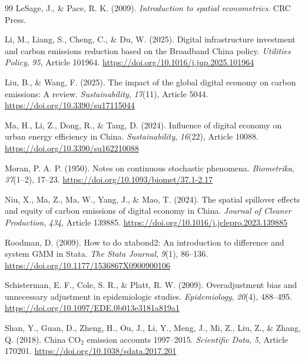 \documentclass[economies,article,submit,moreauthors]{Definitions/mdpi}
\begin{document}
\begin{thebibliography}{99}
LeSage, J., \& Pace, R. K. (2009). \textit{Introduction to spatial econometrics}. CRC Press.

Li, M., Liang, S., Cheng, C., \& Du, W. (2025). Digital infrastructure investment and carbon emissions reduction based on the Broadband China policy. \textit{Utilities Policy}, \textit{95}, Article 101964. \url{https://doi.org/10.1016/j.jup.2025.101964}

Liu, B., \& Wang, F. (2025). The impact of the global digital economy on carbon emissions: A review. \textit{Sustainability}, \textit{17}(11), Article 5044. \url{https://doi.org/10.3390/su17115044}

Ma, H., Li, Z., Dong, R., \& Tang, D. (2024). Influence of digital economy on urban energy efficiency in China. \textit{Sustainability}, \textit{16}(22), Article 10088. \url{https://doi.org/10.3390/su162210088}

Moran, P. A. P. (1950). Notes on continuous stochastic phenomena. \textit{Biometrika}, \textit{37}(1--2), 17--23. \url{https://doi.org/10.1093/biomet/37.1-2.17}

Niu, X., Ma, Z., Ma, W., Yang, J., \& Mao, T. (2024). The spatial spillover effects and equity of carbon emissions of digital economy in China. \textit{Journal of Cleaner Production}, \textit{434}, Article 139885. \url{https://doi.org/10.1016/j.jclepro.2023.139885}

Roodman, D. (2009). How to do xtabond2: An introduction to difference and system GMM in Stata. \textit{The Stata Journal}, \textit{9}(1), 86--136. \url{https://doi.org/10.1177/1536867X0900900106}

Schisterman, E. F., Cole, S. R., \& Platt, R. W. (2009). Overadjustment bias and unnecessary adjustment in epidemiologic studies. \textit{Epidemiology}, \textit{20}(4), 488--495. \url{https://doi.org/10.1097/EDE.0b013e3181a819a1}

Shan, Y., Guan, D., Zheng, H., Ou, J., Li, Y., Meng, J., Mi, Z., Liu, Z., \& Zhang, Q. (2018). China CO$_2$ emission accounts 1997--2015. \textit{Scientific Data}, \textit{5}, Article 170201. \url{https://doi.org/10.1038/sdata.2017.201}


\end{thebibliography}
\end{document}
